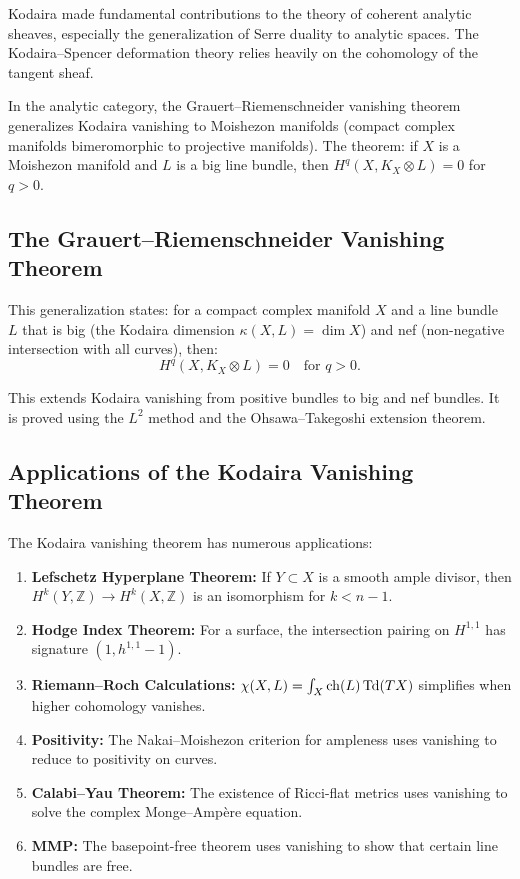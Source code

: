 Kodaira made fundamental contributions to the theory of coherent analytic sheaves, especially the generalization of Serre duality to analytic spaces. The Kodaira--Spencer deformation theory relies heavily on the cohomology of the tangent sheaf.

In the analytic category, the Grauert--Riemenschneider vanishing theorem generalizes Kodaira vanishing to Moishezon manifolds (compact complex manifolds bimeromorphic to projective manifolds). The theorem: if $X$ is a Moishezon manifold and $L$ is a big line bundle, then $H^q(X, K_X \otimes L) = 0$ for $q > 0$.

\subsection{The Grauert--Riemenschneider Vanishing Theorem}

This generalization states: for a compact complex manifold $X$ and a line bundle $L$ that is big (the Kodaira dimension $\kappa(X, L) = \dim X$) and nef (non-negative intersection with all curves), then:
\[
H^q(X, K_X \otimes L) = 0 \quad \text{for } q > 0.
\]

This extends Kodaira vanishing from positive bundles to big and nef bundles. It is proved using the $L^2$ method and the Ohsawa--Takegoshi extension theorem.

\subsection{Applications of the Kodaira Vanishing Theorem}

The Kodaira vanishing theorem has numerous applications:
\begin{enumerate}
    \item \textbf{Lefschetz Hyperplane Theorem:} If $Y \subset X$ is a smooth ample divisor, then $H^k(Y, \mathbb{Z}) \to H^k(X, \mathbb{Z})$ is an isomorphism for $k < n-1$.
    \item \textbf{Hodge Index Theorem:} For a surface, the intersection pairing on $H^{1,1}$ has signature $(1, h^{1,1}-1)$.
    \item \textbf{Riemann--Roch Calculations:} $\chi(X, L) = \int_X \operatorname{ch}(L) \operatorname{Td}(TX)$ simplifies when higher cohomology vanishes.
    \item \textbf{Positivity:} The Nakai--Moishezon criterion for ampleness uses vanishing to reduce to positivity on curves.
    \item \textbf{Calabi--Yau Theorem:} The existence of Ricci-flat metrics uses vanishing to solve the complex Monge--Amp\`{e}re equation.
    \item \textbf{MMP:} The basepoint-free theorem uses vanishing to show that certain line bundles are free.
\end{enumerate}

